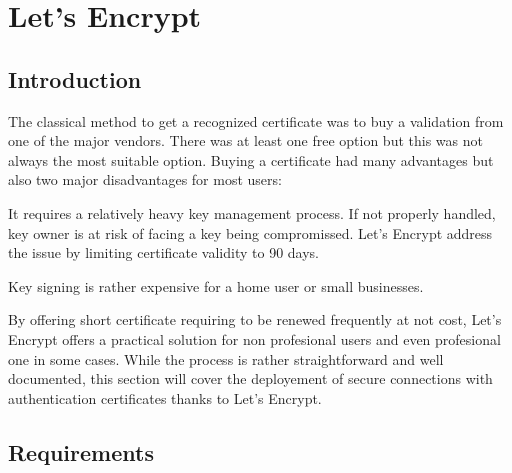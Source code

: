 \section{Let's Encrypt}
\label{sec:hlets-encrypt}

\subsection{Introduction}

The classical method to get a recognized certificate was to buy a validation from one of the major vendors.  There was at least one free option but this was not always the most suitable option.  Buying a certificate had many advantages but also two major disadvantages for most users:

\begin{itemize*}
	\item It requires a relatively heavy key management process.  If not properly handled, key owner is at risk of facing a key being compromissed.  Let's Encrypt address the issue by limiting certificate validity to 90 days.
	\item Key signing is rather expensive for a home user or small businesses.
\end{itemize*}

By offering short certificate requiring to be renewed frequently at not cost, Let's Encrypt offers a practical solution for non profesional users and even profesional one in some cases.  While the process is rather straightforward and well documented, this section will cover the deployement of secure connections with authentication certificates thanks to Let's Encrypt.

\subsection{Requirements}

